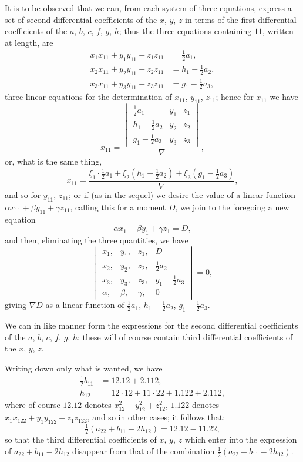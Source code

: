 \documentclass[11pt,a4paper]{article}
\theoremstyle{definition}
\theoremstyle{remark}
\begin{document}
It is to be observed that we can, from each system of three equations, express a set of second differential coefficients of the $x$, $y$, $z$ in terms of the first differential coefficients of the $a$, $b$, $c$, $f$, $g$, $h$; thus the three equations containing $11$, written at length, are
\[
\begin{aligned}
x_1 x_{11} + y_1 y_{11} + z_1 z_{11} &= \tfrac{1}{2}a_1, \\
x_2 x_{11} + y_2 y_{11} + z_2 z_{11} &= h_1 - \tfrac{1}{2}a_2, \\
x_3 x_{11} + y_3 y_{11} + z_3 z_{11} &= g_1 - \tfrac{1}{2}a_3,
\end{aligned}
\]
three linear equations for the determination of $x_{11}$, $y_{11}$, $z_{11}$; hence for $x_{11}$ we have
\[
x_{11} = \frac{\begin{vmatrix} \tfrac{1}{2}a_1 & y_1 & z_1 \\ h_1 - \tfrac{1}{2}a_2 & y_2 & z_2 \\ g_1 - \tfrac{1}{2}a_3 & y_3 & z_3 \end{vmatrix}}{\nabla},
\]
or, what is the same thing,
\[
x_{11} = \frac{\xi_1 \cdot \tfrac{1}{2}a_1 + \xi_2(h_1 - \tfrac{1}{2}a_2) + \xi_3(g_1 - \tfrac{1}{2}a_3)}{\nabla},
\]
and so for $y_{11}$, $z_{11}$; or if (as in the sequel) we desire the value of a linear function $\alpha x_{11} + \beta y_{11} + \gamma z_{11}$, calling this for a moment $D$, we join to the foregoing a new equation
\[
\alpha x_1 + \beta y_1 + \gamma z_1 = D,
\]
and then, eliminating the three quantities, we have
\[
\begin{vmatrix}
x_1, & y_1, & z_1, & D \\
x_2, & y_2, & z_2, & \tfrac{1}{2}a_2 \\
x_3, & y_3, & z_3, & g_1 - \tfrac{1}{2}a_3 \\
\alpha, & \beta, & \gamma, & 0
\end{vmatrix} = 0,
\]
giving $\nabla D$ as a linear function of $\tfrac{1}{2}a_1$, $h_1 - \tfrac{1}{2}a_2$, $g_1 - \tfrac{1}{2}a_3$.

We can in like manner form the expressions for the second differential coefficients of the $a$, $b$, $c$, $f$, $g$, $h$: these will of course contain third differential coefficients of the $x$, $y$, $z$.

Writing down only what is wanted, we have
\[
\begin{aligned}
\tfrac{1}{2}b_{11} &= 12.12 + 2.112, \\
h_{12} &= 12 \cdot 12 + 11 \cdot 22 + 1.122 + 2.112,
\end{aligned}
\]
where of course $12.12$ denotes $x_{12}^2 + y_{12}^2 + z_{12}^2$, $1.122$ denotes $x_1 x_{122} + y_1 y_{122} + z_1 z_{122}$, and so in other cases; it follows that:
\[
\tfrac{1}{2}(a_{22} + b_{11} - 2h_{12}) = 12.12 - 11.22,
\]
so that the third differential coefficients of $x$, $y$, $z$ which enter into the expression of $a_{22} + b_{11} - 2h_{12}$ disappear from that of the combination $\tfrac{1}{2}(a_{22} + b_{11} - 2h_{12})$.
\end{document}
